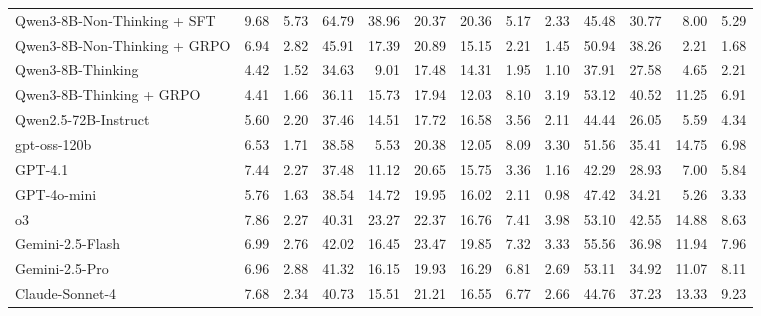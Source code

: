 \begin{table}[t]
\begin{tabular}{@{}lrrrrrrrrrrrr@{}}
Qwen3-8B-Non-Thinking {+} SFT & 9.68 & 5.73 & 64.79 & 38.96 & 20.37 & 20.36 & 5.17 & 2.33 & 45.48 & 30.77 & 8.00 & 5.29 \\
Qwen3-8B-Non-Thinking {+} GRPO & 6.94 & 2.82 & 45.91 & 17.39 & 20.89 & 15.15 & 2.21 & 1.45 & 50.94 & 38.26 & 2.21 & 1.68 \\
Qwen3-8B-Thinking & 4.42 & 1.52 & 34.63 & 9.01 & 17.48 & 14.31 & 1.95 & 1.10 & 37.91 & 27.58 & 4.65 & 2.21 \\
Qwen3-8B-Thinking {+} GRPO & 4.41 & 1.66 & 36.11 & 15.73 & 17.94 & 12.03 & 8.10 & 3.19 & 53.12 & 40.52 & 11.25 & 6.91 \\
Qwen2.5-72B-Instruct & 5.60 & 2.20 & 37.46 & 14.51 & 17.72 & 16.58 & 3.56 & 2.11 & 44.44 & 26.05 & 5.59 & 4.34 \\
gpt-oss-120b & 6.53 & 1.71 & 38.58 & 5.53 & 20.38 & 12.05 & 8.09 & 3.30 & 51.56 & 35.41 & 14.75 & 6.98 \\
GPT-4.1 & 7.44 & 2.27 & 37.48 & 11.12 & 20.65 & 15.75 & 3.36 & 1.16 & 42.29 & 28.93 & 7.00 & 5.84 \\
GPT-4o-mini & 5.76 & 1.63 & 38.54 & 14.72 & 19.95 & 16.02 & 2.11 & 0.98 & 47.42 & 34.21 & 5.26 & 3.33 \\
o3 & 7.86 & 2.27 & 40.31 & 23.27 & 22.37 & 16.76 & 7.41 & 3.98 & 53.10 & 42.55 & 14.88 & 8.63 \\
Gemini-2.5-Flash & 6.99 & 2.76 & 42.02 & 16.45 & 23.47 & 19.85 & 7.32 & 3.33 & 55.56 & 36.98 & 11.94 & 7.96 \\
Gemini-2.5-Pro & 6.96 & 2.88 & 41.32 & 16.15 & 19.93 & 16.29 & 6.81 & 2.69 & 53.11 & 34.92 & 11.07 & 8.11 \\
Claude-Sonnet-4 & 7.68 & 2.34 & 40.73 & 15.51 & 21.21 & 16.55 & 6.77 & 2.66 & 44.76 & 37.23 & 13.33 & 9.23 \\
\bottomrule
\end{tabular}
\end{table}
